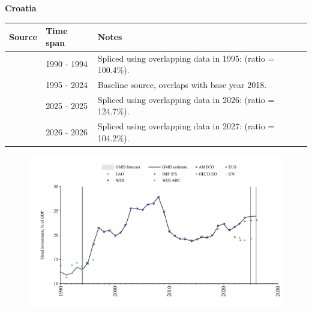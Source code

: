 \documentclass[12pt,a4paper,landscape]{article}
\begin{document}
\begin{adjustbox}{max totalsize={\paperwidth}{\paperheight},center}
\begin{minipage}[t][\textheight][t]{\textwidth}
\vspace*{0.5cm}
{}
\begin{center}
{\Large\bfseries Croatia}
\end{center}
\vspace{0.5cm}
\begin{table}[H]
\centering
\small
\begin{tabular}{|l|l|l|}
\hline
\textbf{Source} & \textbf{Time span} & \textbf{Notes} \\
\hline
\rowcolor{white}\cite{UN}& 1990 - 1994 &Spliced using overlapping data in 1995: (ratio = 100.4\%).\\
\rowcolor{lightgray}\cite{EUS}& 1995 - 2024 &Baseline source, overlaps with base year 2018.\\
\rowcolor{white}\cite{OECD_EO}& 2025 - 2025 &Spliced using overlapping data in 2026: (ratio = 124.7\%).\\
\rowcolor{lightgray}\cite{AMECO}& 2026 - 2026 &Spliced using overlapping data in 2027: (ratio = 104.2\%).\\
\hline
\end{tabular}
\end{table}
\begin{figure}[H]
\centering
\includegraphics[width=\textwidth,height=0.6\textheight,keepaspectratio]{graphs/HRV_finv_GDP.pdf}
\end{figure}
\end{minipage}
\end{adjustbox}
\end{document}
